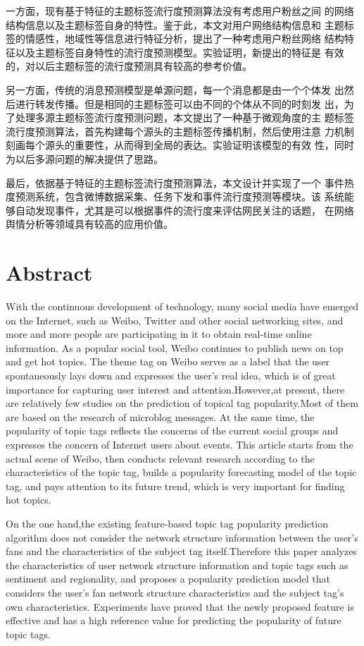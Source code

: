 一方面，现有基于特征的主题标签流行度预测算法没有考虑用户粉丝之间 的网络结构信息以及主题标签自身的特性。鉴于此，本文对用户网络结构信息和 主题标签的情感性，地域性等信息进行特征分析，提出了一种考虑用户粉丝网络 结构特征以及主题标签自身特性的流行度预测模型。实验证明，新提出的特征是 有效的，对以后主题标签的流行度预测具有较高的参考价值。

另一方面，传统的消息预测模型是单源问题，每一个消息都是由一个个体发 出然后进行转发传播。但是相同的主题标签可以由不同的个体从不同的时刻发 出，为了处理多源主题标签流行度预测问题，本文提出了一种基于微观角度的主 题标签流行度预测算法，首先构建每个源头的主题标签传播机制，然后使用注意 力机制刻画每个源头的重要性，从而得到全局的表达。实验证明该模型的有效 性，同时为以后多源问题的解决提供了思路。

最后，依据基于特征的主题标签流行度预测算法，本文设计并实现了一个 事件热度预测系统，包含微博数据采集、任务下发和事件流行度预测等模块。该 系统能够自动发现事件，尤其是可以根据事件的流行度来评估网民关注的话题， 在网络舆情分析等领域具有较高的应用价值。

\chapter*{Abstract}%

With the continuous development of technology, many social media have emerged on the Internet, such as Weibo, Twitter and other social networking sites, and more and more people are participating in it to obtain real-time online information. As a popular social tool, Weibo continues to publish news on top and get hot topics. The theme tag on Weibo serves as a label that the user spontaneously lays down and expresses the user's real idea, which is of great importance for capturing user interest and attention.However,at present, there are relatively few studies on the prediction of topical tag popularity.Most of them are based on the research of microblog messages. At the same time, the popularity of topic tags reflects the concerns of the current social groups and expresses the concern of Internet users about events. This article starts from the actual scene of Weibo, then conducts relevant research according to the characteristics of the topic tag, builds a popularity forecasting model of the topic tag, and pays attention to its future trend, which is very important for finding hot topics.

On the one hand,the existing feature-based topic tag popularity prediction algorithm does not consider the network structure information between the user's fans and the characteristics of the subject tag itself.Therefore this paper analyzes the characteristics of user network structure information and topic tags such as sentiment and regionality, and proposes a popularity prediction model that considers the user's fan network structure characteristics and the subject tag's own characteristics. Experiments have proved that the newly proposed feature is effective and has a high reference value for predicting the popularity of future topic tags.

